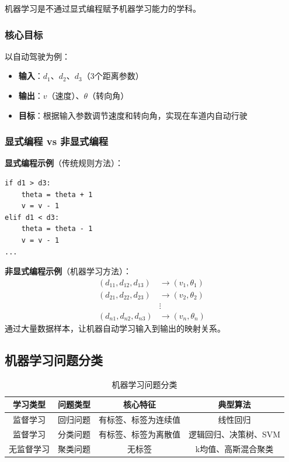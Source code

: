 \documentclass[12pt,a4paper]{ctexart}
\begin{document}
\begin{notebox}[阿瑟·萨缪尔的定义]
机器学习是不通过显式编程赋予机器学习能力的学科。
\end{notebox}

\subsubsection{核心目标}
以自动驾驶为例：
\begin{itemize}
    \item \textbf{输入}：$d_1$、$d_2$、$d_3$（3个距离参数）
    \item \textbf{输出}：$v$（速度）、$\theta$（转向角）
    \item \textbf{目标}：根据输入参数调节速度和转向角，实现在车道内自动行驶
\end{itemize}

\subsubsection{显式编程 vs 非显式编程}

\textbf{显式编程示例}（传统规则方法）：
\begin{verbatim}
if d1 > d3:
    theta = theta + 1
    v = v - 1
elif d1 < d3:
    theta = theta - 1
    v = v - 1
...
\end{verbatim}

\textbf{非显式编程示例}（机器学习方法）：
\[
\begin{aligned}
(d_{11}, d_{12}, d_{13}) &\to (v_1, \theta_1) \\
(d_{21}, d_{22}, d_{23}) &\to (v_2, \theta_2) \\
&\vdots \\
(d_{n1}, d_{n2}, d_{n3}) &\to (v_n, \theta_n)
\end{aligned}
\]
通过大量数据样本，让机器自动学习输入到输出的映射关系。

\subsection{机器学习问题分类}

\begin{table}[H]
\centering
\caption{机器学习问题分类}
\begin{tabular}{cccc}
\toprule
\textbf{学习类型} & \textbf{问题类型} & \textbf{核心特征} & \textbf{典型算法} \\
\midrule
监督学习 & 回归问题 & 有标签、标签为连续值 & 线性回归 \\
监督学习 & 分类问题 & 有标签、标签为离散值 & 逻辑回归、决策树、SVM \\
无监督学习 & 聚类问题 & 无标签 & k均值、高斯混合聚类 \\
\bottomrule
\end{tabular}
\end{table}
\end{document}
